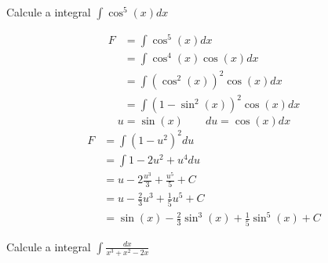 \documentclass[a4paper,12pt,fleqn]{article}
\begin{document}
Calcule a integral
\(
  \int \cos^5(x) dx
\)

\begin{answer}
  \begin{align*}
    F
    & = \int \cos^5(x) dx \\[2mm]
    & = \int \cos^4(x) \cos(x) dx \\[2mm]
    & = \int \left(\cos^2(x)\right)^2 \cos(x) dx \\[2mm]
    & = \int \left(1 - \sin^2(x)\right)^2 \cos(x) dx
  \end{align*}
  \[
    u = \sin(x) \qquad du = \cos(x) dx
  \]
  \begin{align*}
    F
    & = \int \left(1 - u^2\right)^2 du \\[2mm]
    & = \int 1 - 2u^2 + u^4 du \\[2mm]
    & = u - 2\frac{u^3}{3} + \frac{u^5}{5} + C \\[2mm]
    & = u - \frac{2}{3}u^3 + \frac{1}{5}u^5 + C\\[2mm]
    & = \sin(x) - \frac{2}{3}\sin^3(x) + \frac{1}{5}\sin^5(x) + C
  \end{align*}
  \clearpage
\end{answer}

Calcule a integral
\(
  \int \frac{dx}{x^3 + x^2 - 2x}
\)
\end{document}
